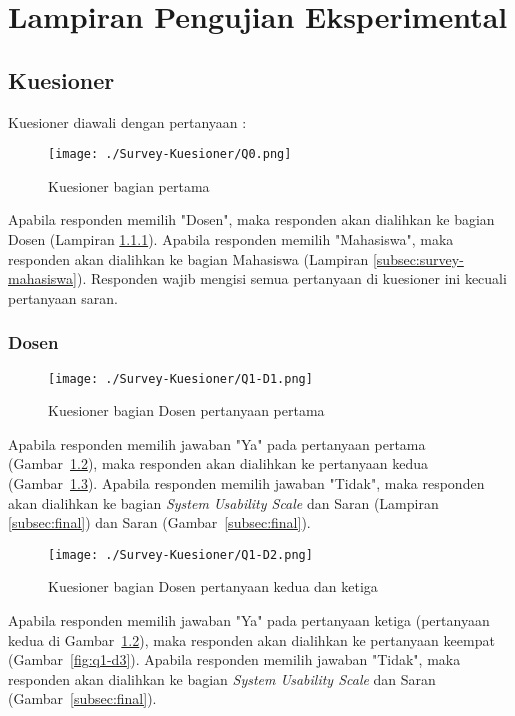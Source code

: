\chapter{Lampiran Pengujian Eksperimental}
\label{lamp:B}

\section{Kuesioner}
\label{sec:survey}
Kuesioner diawali dengan pertanyaan :
\begin{figure}[H]
	\centering  
	\texttt{[image: ./Survey-Kuesioner/Q0.png]}  
	\caption[Kuesioner bagian pertama]{Kuesioner bagian pertama} 
	\label{fig:q0} 
\end{figure}

Apabila responden memilih "Dosen", maka responden akan dialihkan ke bagian Dosen (Lampiran \ref{subsec:survey-dosen}). Apabila responden memilih "Mahasiswa", maka responden akan dialihkan ke bagian Mahasiswa (Lampiran \ref{subsec:survey-mahasiswa}). Responden wajib mengisi semua pertanyaan di kuesioner ini kecuali pertanyaan saran.

\subsection{Dosen}
\label{subsec:survey-dosen}
\begin{figure}[H]
	\centering  
	\texttt{[image: ./Survey-Kuesioner/Q1-D1.png]}  
	\caption[Kuesioner bagian Dosen pertanyaan pertama]{Kuesioner bagian Dosen pertanyaan pertama} 
	\label{fig:q1-d1} 
\end{figure}

Apabila responden memilih jawaban "Ya" pada pertanyaan pertama (Gambar~\ref{fig:q1-d1}), maka responden akan dialihkan ke pertanyaan kedua (Gambar~\ref{fig:q1-d2}). Apabila responden memilih jawaban "Tidak", maka responden akan dialihkan ke bagian \textit{System Usability Scale} dan Saran (Lampiran \ref{subsec:final}) dan Saran (Gambar~\ref{subsec:final}). 

\begin{figure}[H]
	\centering  
	\texttt{[image: ./Survey-Kuesioner/Q1-D2.png]}  
	\caption[Kuesioner bagian Dosen pertanyaan kedua dan ketiga]{Kuesioner bagian Dosen pertanyaan kedua dan ketiga} 
	\label{fig:q1-d2} 
\end{figure}

Apabila responden memilih jawaban "Ya" pada pertanyaan ketiga (pertanyaan kedua di Gambar~\ref{fig:q1-d1}), maka responden akan dialihkan ke pertanyaan keempat (Gambar~\ref{fig:q1-d3}). Apabila responden memilih jawaban "Tidak", maka responden akan dialihkan ke bagian \textit{System Usability Scale} dan Saran (Gambar~\ref{subsec:final}). 

